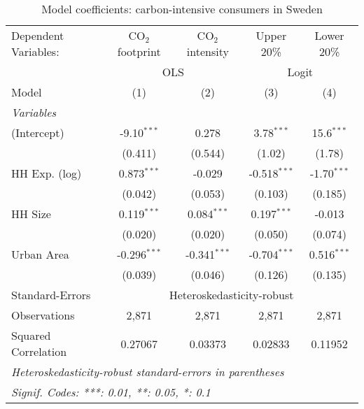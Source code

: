 
\begin{table}[htbp!]
   \centering
   \small
   \begin{adjustbox}{width = 1\textwidth, max height = 0.95\textheight, center}
      \begin{threeparttable}[b]
         \caption{\label{tab:Logit_1_SWE} Model coefficients: carbon-intensive consumers in Sweden}
         \begin{tabular}{lcccc}
            \tabularnewline \midrule \midrule
            Dependent Variables: & CO$_{2}$ footprint & CO$_{2}$ intensity & Upper 20\%     & Lower 20\%\\   
             & \multicolumn{2}{c}{OLS} & \multicolumn{2}{c}{Logit} \\ 
            Model                & (1)                & (2)                & (3)            & (4)\\  
            \midrule
            \emph{Variables}\\
            (Intercept)          & -9.10$^{***}$      & 0.278              & 3.78$^{***}$   & 15.6$^{***}$\\   
                                 & (0.411)            & (0.544)            & (1.02)         & (1.78)\\   
            HH Exp. (log)        & 0.873$^{***}$      & -0.029             & -0.518$^{***}$ & -1.70$^{***}$\\   
                                 & (0.042)            & (0.053)            & (0.103)        & (0.185)\\   
            HH Size              & 0.119$^{***}$      & 0.084$^{***}$      & 0.197$^{***}$  & -0.013\\   
                                 & (0.020)            & (0.020)            & (0.050)        & (0.074)\\   
            Urban Area           & -0.296$^{***}$     & -0.341$^{***}$     & -0.704$^{***}$ & 0.516$^{***}$\\   
                                 & (0.039)            & (0.046)            & (0.126)        & (0.135)\\   
            \midrule 
            Standard-Errors & \multicolumn{4}{c}{Heteroskedasticity-robust} \\ 
            Observations         & 2,871              & 2,871              & 2,871          & 2,871\\  
            Squared Correlation  & 0.27067            & 0.03373            & 0.02833        & 0.11952\\  
            \midrule \midrule
            \multicolumn{5}{l}{\emph{Heteroskedasticity-robust standard-errors in parentheses}}\\
            \multicolumn{5}{l}{\emph{Signif. Codes: ***: 0.01, **: 0.05, *: 0.1}}\\
         \end{tabular}
         

\end{threeparttable}
\end{adjustbox}
\end{table}
